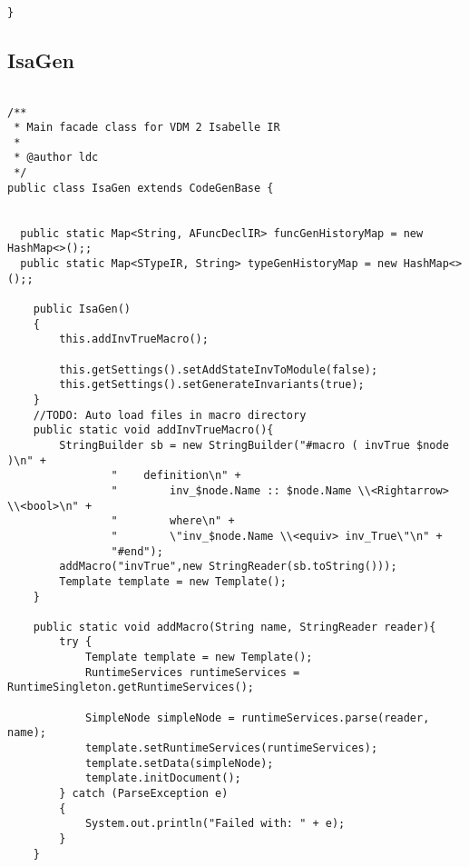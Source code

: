 \begin{appendices}
\begin{lstlisting}
}
\end{lstlisting}

\subsection{IsaGen} \label{IsaGenafter}
\begin{lstlisting}

/**
 * Main facade class for VDM 2 Isabelle IR
 *
 * @author ldc
 */
public class IsaGen extends CodeGenBase {


  public static Map<String, AFuncDeclIR> funcGenHistoryMap = new HashMap<>();;
  public static Map<STypeIR, String> typeGenHistoryMap = new HashMap<>();;
  
    public IsaGen()
    {
        this.addInvTrueMacro();

        this.getSettings().setAddStateInvToModule(false);
        this.getSettings().setGenerateInvariants(true);
    }
    //TODO: Auto load files in macro directory
    public static void addInvTrueMacro(){
        StringBuilder sb = new StringBuilder("#macro ( invTrue $node )\n" +
                "    definition\n" +
                "        inv_$node.Name :: $node.Name \\<Rightarrow> \\<bool>\n" +
                "        where\n" +
                "        \"inv_$node.Name \\<equiv> inv_True\"\n" +
                "#end");
        addMacro("invTrue",new StringReader(sb.toString()));
        Template template = new Template();
    }

    public static void addMacro(String name, StringReader reader){
        try {
            Template template = new Template();
            RuntimeServices runtimeServices = RuntimeSingleton.getRuntimeServices();

            SimpleNode simpleNode = runtimeServices.parse(reader, name);
            template.setRuntimeServices(runtimeServices);
            template.setData(simpleNode);
            template.initDocument();
        } catch (ParseException e)
        {
            System.out.println("Failed with: " + e);
        }
    }


\end{lstlisting}
\end{appendices}
